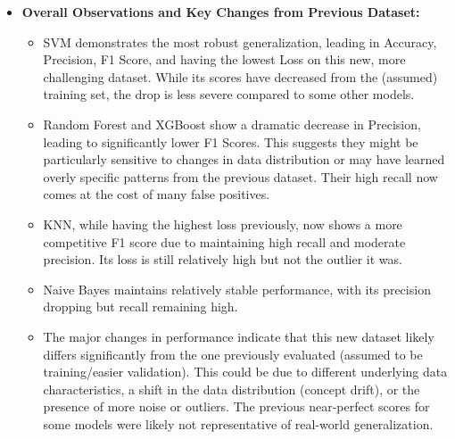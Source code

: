 \begin{itemize}
    \item \textbf{Overall Observations and Key Changes from Previous Dataset:}
    \begin{itemize}
        \item SVM demonstrates the most robust generalization, leading in Accuracy, Precision, F1 Score, and having the lowest Loss on this new, more challenging dataset. While its scores have decreased from the (assumed) training set, the drop is less severe compared to some other models.
        \item Random Forest and XGBoost show a dramatic decrease in Precision, leading to significantly lower F1 Scores. This suggests they might be particularly sensitive to changes in data distribution or may have learned overly specific patterns from the previous dataset. Their high recall now comes at the cost of many false positives.
        \item KNN, while having the highest loss previously, now shows a more competitive F1 score due to maintaining high recall and moderate precision. Its loss is still relatively high but not the outlier it was.
        \item Naive Bayes maintains relatively stable performance, with its precision dropping but recall remaining high.
        \item The major changes in performance indicate that this new dataset likely differs significantly from the one previously evaluated (assumed to be training/easier validation). This could be due to different underlying data characteristics, a shift in the data distribution (concept drift), or the presence of more noise or outliers. The previous near-perfect scores for some models were likely not representative of real-world generalization.
    \end{itemize}
\end{itemize}

